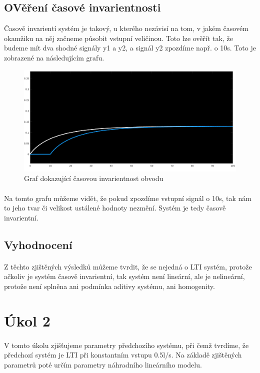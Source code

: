 \documentclass{article}
\begin{document}
	   	\subsection{OVěření časové invarientnosti}
	   	Časově invarientí systém je takový, u kterého nezávisí na tom, v jakém časovém okamžiku na něj začneme působit vstupní veličinou. Toto lze ověřít tak, že budeme mít dva shodné signály y1 a y2, a signál y2 zpozdíme např. o 10s. Toto je zobrazené na následujícím grafu.
	  		\begin{figure}[H]
	  		\centering
	  		\includegraphics[width=\textwidth]{ukol1invar}
	  		\caption{Graf dokazující časovou invarientnost obvodu}
	  		\end{figure}
   	\paragraph{}
   	Na tomto grafu můžeme vidět, že pokud zpozdíme vstupní signál o 10s, tak nám to jeho tvar či velikost ustálené hodnoty nezmění. Systém je tedy časově invarientní.
   	
   	\subsection{Vyhodnocení}
   	\paragraph{}
   	Z těchto zjištěných výsledků můžeme tvrdit, že se nejedná o LTI systém, protože ačkoliv je systém časově invarientní, tak systém není lineární, ale je nelineární, protože není splněna ani podmínka aditivy systému, ani homogenity.
   	
   	\section{Úkol 2}
	\paragraph{}
		V tomto úkolu zjišťujeme parametry předchozího systému, při čemž tvrdíme, že předchozí systém je LTI při konstantním vstupu 0.5l/s. Na základě zjištěných parametrů poté určím parametry náhradního lineárního modelu.
		
\end{document}

